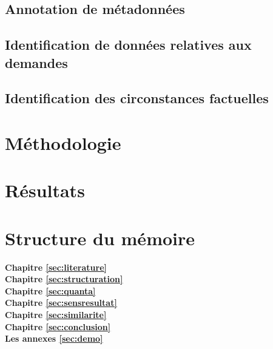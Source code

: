 \subsection{Annotation de métadonnées}

\subsection{Identification de données relatives aux demandes}

\subsection{Identification des circonstances factuelles}

\section{Méthodologie}
\label{sec:intro:methodologie}


\section{Résultats}
\label{sec:intro:résultats}

\section{Structure du mémoire}
\label{sec:intro:organisation}

\textbf{Chapitre \ref{sec:literature}} \\[0.2em]

\textbf{Chapitre \ref{sec:structuration}} \\[0.2em]

\textbf{Chapitre \ref{sec:quanta}} \\[0.2em]

\textbf{Chapitre \ref{sec:sensresultat}} \\[0.2em]

\textbf{Chapitre \ref{sec:similarite}} \\[0.2em]

\textbf{Chapitre \ref{sec:conclusion}} \\[0.2em]

\textbf{Les annexes \ref{sec:demo}} \\[0.2em]
